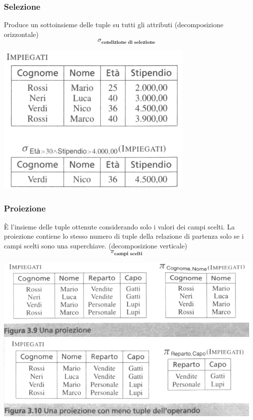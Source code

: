 \documentclass[a4paper]{article}
\begin{document}
\subsubsection{Selezione}
Produce un sottoinsieme delle tuple su tutti gli attributi (decomposizione orizzontale)
\[\sigma_{\textbf{condizione di selezione}}\]
\begin{center}
      \includegraphics[scale=0.45]{img/ar3.png}
\end{center}

\subsubsection{Proiezione}
È l’insieme delle tuple ottenute considerando solo i valori dei campi scelti. La proiezione contiene lo stesso numero di tuple della relazione di partenza solo se i campi scelti sono una superchiave. (decomposizione verticale)
\[\pi_{\textbf{campi scelti}}\]
\begin{center}
      \includegraphics[scale=0.45]{img/ar4.png}\\
      \includegraphics[scale=0.45]{img/ar5.png}
\end{center}
\end{document}
